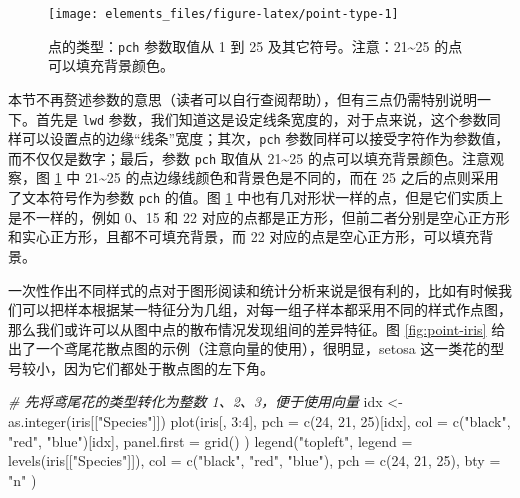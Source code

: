 \documentclass[
  b5paper,
  UTF8,twoside]{book}
\newenvironment{Shaded}{\begin{snugshade}}{\end{snugshade}}
\newcommand{\AttributeTok}[1]{\textcolor[rgb]{0.77,0.63,0.00}{#1}}
\newcommand{\CommentTok}[1]{\textcolor[rgb]{0.56,0.35,0.01}{\textit{#1}}}
\newcommand{\DecValTok}[1]{\textcolor[rgb]{0.00,0.00,0.81}{#1}}
\newcommand{\FunctionTok}[1]{\textcolor[rgb]{0.00,0.00,0.00}{#1}}
\newcommand{\NormalTok}[1]{#1}
\newcommand{\OtherTok}[1]{\textcolor[rgb]{0.56,0.35,0.01}{#1}}
\newcommand{\SpecialCharTok}[1]{\textcolor[rgb]{0.00,0.00,0.00}{#1}}
\newcommand{\StringTok}[1]{\textcolor[rgb]{0.31,0.60,0.02}{#1}}
\begin{document}
\begin{figure}

{\centering \texttt{[image: elements\_files/figure-latex/point-type-1]} 

}

\caption[点的类型：\texttt{pch} 参数取值从 0 到 25 及其它符号]{点的类型：\texttt{pch} 参数取值从 1 到 25 及其它符号。注意：21\textasciitilde25 的点可以填充背景颜色。}\label{fig:point-type}
\end{figure}





本节不再赘述参数的意思（读者可以自行查阅帮助），但有三点仍需特别说明一下。首先是 \texttt{lwd} 参数，我们知道这是设定线条宽度的，对于点来说，这个参数同样可以设置点的边缘``线条''宽度；其次，\texttt{pch} 参数同样可以接受字符作为参数值，而不仅仅是数字；最后，参数 \texttt{pch} 取值从 21\textasciitilde25 的点可以填充背景颜色。注意观察，图 \ref{fig:point-type} 中 21\textasciitilde25 的点边缘线颜色和背景色是不同的，而在 25 之后的点则采用了文本符号作为参数 \texttt{pch} 的值。图 \ref{fig:point-type} 中也有几对形状一样的点，但是它们实质上是不一样的，例如 0、15 和 22 对应的点都是正方形，但前二者分别是空心正方形和实心正方形，且都不可填充背景，而 22 对应的点是空心正方形，可以填充背景。

一次性作出不同样式的点对于图形阅读和统计分析来说是很有利的，比如有时候我们可以把样本根据某一特征分为几组，对每一组子样本都采用不同的样式作点图，那么我们或许可以从图中点的散布情况发现组间的差异特征。图 \ref{fig:point-iris} 给出了一个鸢尾花散点图的示例（注意向量的使用），很明显，setosa 这一类花的型号较小，因为它们都处于散点图的左下角。

\begin{Shaded}
\begin{Highlighting}[]
\CommentTok{\# 先将鸢尾花的类型转化为整数 1、2、3，便于使用向量}
\NormalTok{idx }\OtherTok{\textless{}{-}} \FunctionTok{as.integer}\NormalTok{(iris[[}\StringTok{"Species"}\NormalTok{]])}
\FunctionTok{plot}\NormalTok{(iris[, }\DecValTok{3}\SpecialCharTok{:}\DecValTok{4}\NormalTok{],}
  \AttributeTok{pch =} \FunctionTok{c}\NormalTok{(}\DecValTok{24}\NormalTok{, }\DecValTok{21}\NormalTok{, }\DecValTok{25}\NormalTok{)[idx],}
  \AttributeTok{col =} \FunctionTok{c}\NormalTok{(}\StringTok{"black"}\NormalTok{, }\StringTok{"red"}\NormalTok{, }\StringTok{"blue"}\NormalTok{)[idx], }\AttributeTok{panel.first =} \FunctionTok{grid}\NormalTok{()}
\NormalTok{)}
\FunctionTok{legend}\NormalTok{(}\StringTok{"topleft"}\NormalTok{,}
  \AttributeTok{legend =} \FunctionTok{levels}\NormalTok{(iris[[}\StringTok{"Species"}\NormalTok{]]),}
  \AttributeTok{col =} \FunctionTok{c}\NormalTok{(}\StringTok{"black"}\NormalTok{, }\StringTok{"red"}\NormalTok{, }\StringTok{"blue"}\NormalTok{), }\AttributeTok{pch =} \FunctionTok{c}\NormalTok{(}\DecValTok{24}\NormalTok{, }\DecValTok{21}\NormalTok{, }\DecValTok{25}\NormalTok{), }\AttributeTok{bty =} \StringTok{"n"}
\NormalTok{)}
\end{Highlighting}
\end{Shaded}
\end{document}
